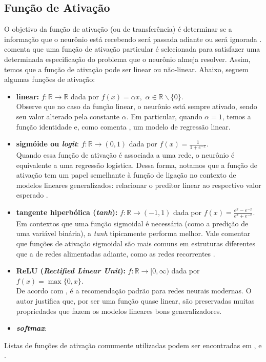\documentclass{automatextcc}
\newcommand{\R}{\mathds{R}}
\begin{document}
\subsection{Função de Ativação}
O objetivo da função de ativação (ou de transferência) é determinar se a informação que o neurônio está recebendo será passada adiante ou será ignorada \citep{dsa2022}. \citet{hagan2014} comenta que uma função de ativação particular é selecionada para satisfazer uma determinada especificação do problema que o neurônio almeja resolver. Assim, temos que a função de ativação pode ser linear ou não-linear. Abaixo, seguem algumas funções de ativação:

\begin{itemize}
    \item \textbf{linear:} $f: \R \rightarrow \R$ dada por $f(x) = \alpha x,$  $\alpha \in \R\backslash\{0\}$. \\
    Observe que no caso da função linear, o neurônio está sempre ativado, sendo seu valor alterado pela constante $\alpha$. Em particular, quando $\alpha=1$, temos a função identidade e, como comenta \citet{sarle1994}, um modelo de regressão linear.
    \item \textbf{sigmóide ou \textit{logit}}: $f: \R \rightarrow (0,1)$ dada por $f(x) = \frac{1}{1 + e^{-x}}$. \\
    Quando essa função de ativação é associada a uma rede, o neurônio é equivalente a uma regressão logística. Dessa forma, notamos que a função de ativação tem um papel semelhante à função de ligação no contexto de modelos lineares generalizados: relacionar o preditor linear ao respectivo valor esperado \citep{sarle1994,frei2020,mccullagh1989}.
    \item \textbf{tangente hiperbólica (\textit{tanh}):}  $f:\R \rightarrow (-1,1)$ dada por $f(x) = \frac{e^{x}-e^{-x}}{e^{x}+e^{-x}}$. \\
    Em contextos que uma função sigmoidal é necessária (como a predição de uma variável binária), a \textit{tanh} tipicamente performa melhor. Vale comentar que funções de ativação sigmoidal são mais comuns em estruturas diferentes que a de redes alimentadas adiante, como as redes recorrentes \citep{goodfellow2016}.  
    \item \textbf{ReLU (\textit{Rectified Linear Unit}):} $f: \R \rightarrow [0,\infty)$ dada por $f(x) = \max\{0,x\}$. \\
    De acordo com \citet{goodfellow2016}, é a recomendação padrão para redes neurais modernas. O autor justifica que, por ser uma função quase linear, são preservadas muitas propriedades que fazem os modelos lineares bons generalizadores. %
    \item \textbf{\textit{softmax}}:
\end{itemize}
Listas de funções de ativação comumente utilizadas podem ser encontradas em \citet{hagan2014}, \citet{aggarwal2018} e \citet{dsa2022}.
\end{document}
